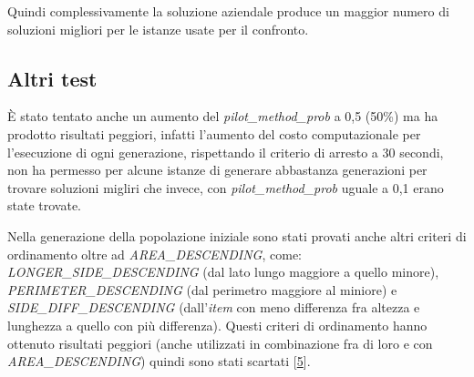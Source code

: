 Quindi complessivamente la soluzione aziendale produce un maggior numero di soluzioni migliori per le istanze usate per il confronto.

\subsection{Altri test} \hypertarget{chiara3}{}

È stato tentato anche un aumento del \emph{pilot\_method\_prob} a 0,5 (50\%) ma ha prodotto risultati peggiori, infatti l'aumento del costo computazionale per l'esecuzione di ogni generazione, rispettando il criterio di arresto a 30 secondi, non ha permesso per alcune istanze di generare abbastanza generazioni per trovare soluzioni migliri che invece, con \emph{pilot\_method\_prob} uguale a 0,1 erano state trovate.

Nella generazione della popolazione iniziale sono stati provati anche altri criteri di ordinamento oltre ad \emph{AREA\_DESCENDING}, come: \emph{LONGER\_SIDE\_DESCENDING} (dal lato lungo maggiore a quello minore), \emph{PERIMETER\_DESCENDING} (dal perimetro maggiore al miniore) e \emph{SIDE\_DIFF\_DESCENDING} (dall'\emph{item} con meno differenza fra altezza e lunghezza a quello con più differenza). Questi criteri di ordinamento hanno ottenuto risultati peggiori (anche utilizzati in combinazione fra di loro e con \emph{AREA\_DESCENDING}) quindi sono stati scartati [\hyperlink{bibliografia}{5}]. 